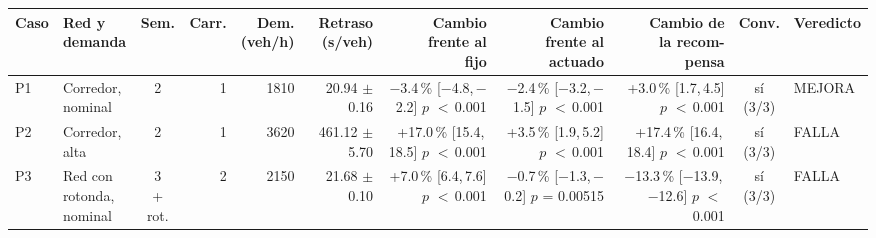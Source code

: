 \begin{table}[H]
\centering
\scriptsize
\setlength{\tabcolsep}{1.5pt}
\begin{tabular}{llcrrrrrrcl}
\toprule
Caso & \makecell[l]{Red y\\demanda} & Sem. & Carr. & \makecell{Dem.\\(veh/h)} & \makecell{Retraso\\(s/veh)} & \makecell{Cambio\\frente al\\fijo} & \makecell{Cambio\\frente al\\actuado} & \makecell{Cambio de\\la recom-\\pensa} & Conv. & Veredicto \\
\midrule
P1 & \makecell[l]{Corredor,\\{}nominal} & 2 & 1 & 1810 & \makecell[r]{20.94\\{}$\pm$ 0.16} & \makecell[r]{$-$3.4\,\%\\{}[$-$4.8,\,$-$2.2]\\$p$ $<$\,0.001} & \makecell[r]{$-$2.4\,\%\\{}[$-$3.2,\,$-$1.5]\\$p$ $<$\,0.001} & \makecell[r]{+3.0\,\%\\{}[1.7,\,4.5]\\$p$ $<$\,0.001} & \makecell[c]{sí\\{}(3/3)} & MEJORA \\
P2 & \makecell[l]{Corredor,\\{}alta} & 2 & 1 & 3620 & \makecell[r]{461.12\\{}$\pm$ 5.70} & \makecell[r]{+17.0\,\%\\{}[15.4,\,18.5]\\$p$ $<$\,0.001} & \makecell[r]{+3.5\,\%\\{}[1.9,\,5.2]\\$p$ $<$\,0.001} & \makecell[r]{+17.4\,\%\\{}[16.4,\,18.4]\\$p$ $<$\,0.001} & \makecell[c]{sí\\{}(3/3)} & FALLA \\
P3 & \makecell[l]{Red con\\{}rotonda,\\{}nominal} & \makecell[c]{3\\{}+ rot.} & 2 & 2150 & \makecell[r]{21.68\\{}$\pm$ 0.10} & \makecell[r]{+7.0\,\%\\{}[6.4,\,7.6]\\$p$ $<$\,0.001} & \makecell[r]{$-$0.7\,\%\\{}[$-$1.3,\,$-$0.2]\\$p$ = 0.00515} & \makecell[r]{$-$13.3\,\%\\{}[$-$13.9,\,$-$12.6]\\$p$ $<$\,0.001} & \makecell[c]{sí\\{}(3/3)} & FALLA \\

\end{tabular}
\end{table}
